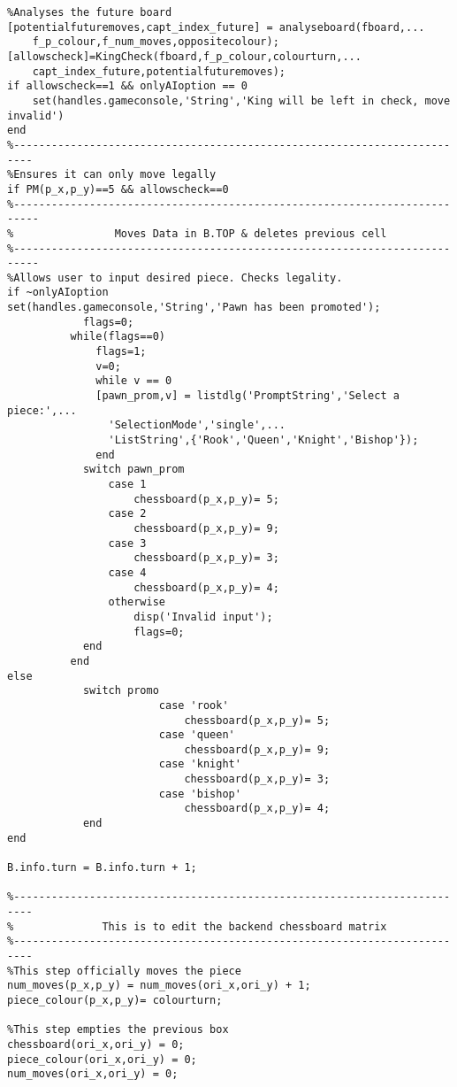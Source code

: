 \documentclass{article}
\begin{document}
\begin{lstlisting}
%Analyses the future board
[potentialfuturemoves,capt_index_future] = analyseboard(fboard,...
    f_p_colour,f_num_moves,oppositecolour);
[allowscheck]=KingCheck(fboard,f_p_colour,colourturn,...
    capt_index_future,potentialfuturemoves);
if allowscheck==1 && onlyAIoption == 0
    set(handles.gameconsole,'String','King will be left in check, move invalid')
end
%-------------------------------------------------------------------------
%Ensures it can only move legally
if PM(p_x,p_y)==5 && allowscheck==0
%--------------------------------------------------------------------------
%                Moves Data in B.TOP & deletes previous cell
%--------------------------------------------------------------------------
%Allows user to input desired piece. Checks legality.
if ~onlyAIoption
set(handles.gameconsole,'String','Pawn has been promoted');
            flags=0;
          while(flags==0)
              flags=1;
              v=0;
              while v == 0
              [pawn_prom,v] = listdlg('PromptString','Select a piece:',...
                'SelectionMode','single',...
                'ListString',{'Rook','Queen','Knight','Bishop'});
              end
            switch pawn_prom
                case 1
                    chessboard(p_x,p_y)= 5;
                case 2
                    chessboard(p_x,p_y)= 9;
                case 3
                    chessboard(p_x,p_y)= 3;
                case 4
                    chessboard(p_x,p_y)= 4;
                otherwise
                    disp('Invalid input');
                    flags=0;
            end   
          end
else
            switch promo
                        case 'rook'
                            chessboard(p_x,p_y)= 5;
                        case 'queen'
                            chessboard(p_x,p_y)= 9;
                        case 'knight'
                            chessboard(p_x,p_y)= 3;
                        case 'bishop'
                            chessboard(p_x,p_y)= 4;
            end   
end

B.info.turn = B.info.turn + 1;

%-------------------------------------------------------------------------
%              This is to edit the backend chessboard matrix
%-------------------------------------------------------------------------
%This step officially moves the piece
num_moves(p_x,p_y) = num_moves(ori_x,ori_y) + 1;
piece_colour(p_x,p_y)= colourturn;
 
%This step empties the previous box
chessboard(ori_x,ori_y) = 0;
piece_colour(ori_x,ori_y) = 0;
num_moves(ori_x,ori_y) = 0;


\end{lstlisting}
\end{document}
